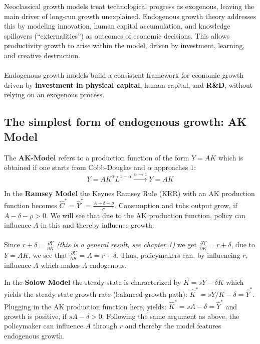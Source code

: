 \begin{tcolorbox}[
    colback=green!5!white, %
    colframe=darkgreen!40!white, %
   title=Motivation, %
    fonttitle=\bfseries %
    ]
    Neoclassical growth models treat technological progress as exogenous, leaving the main driver of long-run growth unexplained. Endogenous growth theory addresses this by modeling innovation, human capital accumulation, and knowledge spillovers (“externalities”) as outcomes of economic decisions. This allows productivity growth to arise within the model, driven by investment, learning, and creative destruction.\\\\
    Endogenous growth models build a consistent framework for economic growth driven by \textbf{investment in physical capital}, human capital, and \textbf{R\&D}, without relying on an exogenous process. 
  
\end{tcolorbox}

\subsection{The simplest form of endogenous growth: AK Model}
\noindent The \textbf{AK-Model} refers to a production function of the form $Y=AK$ which is obtained if one starts from Cobb-Douglas and $\alpha$ approaches $1$:
$$Y=AK^\alpha L^{1-\alpha} \xrightarrow{\alpha \rightarrow 1}Y=AK$$
\par\noindent{\color{lightgray}\rule{\linewidth}{0.4pt}}
In the \textbf{Ramsey Model} the Keynes Ramsey Rule (KRR) with an AK production function becomes $\hat{C}^*=  \hat{Y}^*=\frac{A-\delta-\rho}{\sigma}$. Consumption and tuhs output grow, if $A-\delta-\rho>0$. We will see that due to the AK production function, policy can influence $A$ in this  and thereby influence growth: \\\\
Since $r+\delta=\frac{\partial Y}{\partial K}$ \textit{(this is a general result, see chapter 1)} we get $\frac{\partial Y}{\partial K}=r+\delta$, due to $Y=AK$, we see that $\frac{\partial Y}{\partial K}=A=r+\delta$. Thus, policymakers can, by influencing $r$, influence $A$ which makes $A$ endogenous. 
\par\noindent{\color{lightgray}\rule{\linewidth}{0.4pt}}
In the \textbf{Solow Model} the steady state is characterized by $\dot{K}=sY-\delta K$ which yields the steady state growth rate (balanced growth path): $\hat{K}^*=sY/K-\delta=\hat{Y}^*$. Plugging in the AK production function here, yields: $\hat{K}^*=sA-\delta=\hat{Y}^*$ and growth is positive, if $sA-\delta>0$. Following the same argument as above, the policymaker can influence $A$ through $r$ and thereby the model features endogenous growth.
